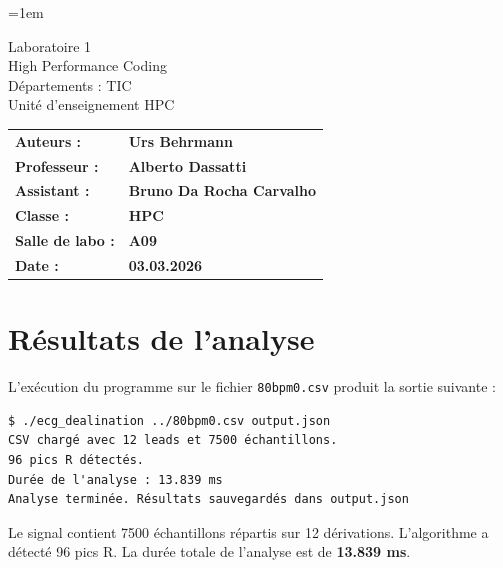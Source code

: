 \documentclass[a4paper,12pt]{article}
\author{Urs Behrmann}
\begin{document}
\emergencystretch=1em %

\thispagestyle{firstpage}


\vspace*{2cm}
\begin{center}
    \Huge Laboratoire 1 \\
    \vspace{0.2cm}
    \Large High Performance Coding\\
    \vspace{1cm}
    \small Départements : TIC\\
    Unité d'enseignement HPC\\
\end{center}

\vspace{9cm}

\renewcommand{\arraystretch}{1.5} %

\begin{flushleft} %
    \begin{tabular}{@{}l l@{}}
        \textbf{Auteurs :}       & \textbf{Urs Behrmann} \\
        \textbf{Professeur :}    & \textbf{Alberto Dassatti} \\
        \textbf{Assistant :}     & \textbf{Bruno Da Rocha Carvalho} \\
        \textbf{Classe :}        & \textbf{HPC} \\
        \textbf{Salle de labo :} & \textbf{A09} \\
        \textbf{Date :}          & \textbf{03.03.2026} \\
    \end{tabular}
\end{flushleft}

\newpage

\pagestyle{otherpages}

\tableofcontents

\newpage

\section{Résultats de l'analyse}

L'exécution du programme sur le fichier \texttt{80bpm0.csv} produit la sortie suivante :

\begin{verbatim}
$ ./ecg_dealination ../80bpm0.csv output.json
CSV chargé avec 12 leads et 7500 échantillons.
96 pics R détectés.
Durée de l'analyse : 13.839 ms
Analyse terminée. Résultats sauvegardés dans output.json
\end{verbatim}

Le signal contient 7500 échantillons répartis sur 12 dérivations. L'algorithme a
détecté 96 pics R. La durée totale de l'analyse est de
\textbf{13.839 ms}.
\end{document}
